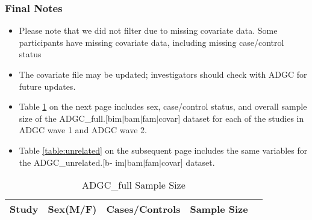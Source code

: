 \documentclass[12pt]{article}
\begin{document}
\subsubsection{Final Notes}
\begin{itemize}

\item Please note that we did not filter due to missing covariate data. Some participants have missing covariate data, including missing case/control status

\item The covariate file may be updated; investigators should check with ADGC for future updates.

\item Table \ref{table:full} on the next page includes sex, case/control status, and overall sample size of the ADGC\_full.[bim$|$bam$|$fam$|$covar] dataset for each of the studies in ADGC wave 1 and ADGC wave 2.

\item Table \ref{table:unrelated} on the subsequent page includes the same variables for the ADGC\_unrelated.[b-
\newline
im$|$bam$|$fam$|$covar] dataset.

\end{itemize}

\begin{table}[H] \caption{ADGC\_full Sample Size}
\begin{center}
\begin{tabular}{lcccc}
\hline
Study 	&	Sex(M/F)	&	Cases/Controls	&	Sample Size	\\ \hline
\end{tabular}
\end{center}
\label{table:full}
\end{table}
\end{document}
